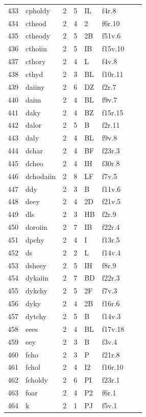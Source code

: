\documentclass[11pt,a4paper]{article}
\begin{document}
\begin{landscape}
\begin{longtable}{@{}r>{\ttfamily}lrrl>{\ttfamily}l>{\raggedright\arraybackslash}p{80mm}>{\raggedright\arraybackslash}p{36mm}@{}}
433 & cpholdy & 2 & 5 & IL & f4r.8 &  & \\
434 & ctheod & 2 & 4 & 2 & f6r.10 &  & \\
435 & ctheody & 2 & 5 & 2B & f51v.6 &  & \\
436 & cthoiin & 2 & 5 & IB & f15v.10 &  & \\
437 & cthory & 2 & 4 & L & f4v.8 &  & \\
438 & cthyd & 2 & 3 & BL & f10r.11 &  & \\
439 & daiiny & 2 & 6 & DZ & f2r.7 &  & \\
440 & daim & 2 & 4 & BL & f9v.7 &  & \\
441 & daky & 2 & 4 & BZ & f15r.15 &  & \\
442 & dalor & 2 & 5 & B & f2r.11 &  & \\
443 & daly & 2 & 4 & BL & f9v.8 &  & \\
444 & dchar & 2 & 4 & BF & f23r.3 &  & \\
445 & dcheo & 2 & 4 & IH & f30r.8 &  & \\
446 & dchodaiin & 2 & 8 & LF & f7v.5 &  & \\
447 & ddy & 2 & 3 & B & f11v.6 &  & \\
448 & deey & 2 & 4 & 2D & f21v.5 &  & \\
449 & dls & 2 & 3 & HB & f2r.9 &  & \\
450 & doroiin & 2 & 7 & IB & f22r.4 &  & \\
451 & dpchy & 2 & 4 & I & f13r.5 &  & \\
452 & ds & 2 & 2 & L & f14v.4 &  & \\
453 & dsheey & 2 & 5 & IH & f8r.9 &  & \\
454 & dykaiin & 2 & 7 & BD & f22r.3 &  & \\
455 & dykchy & 2 & 5 & 2F & f7v.3 &  & \\
456 & dyky & 2 & 4 & 2B & f16r.6 &  & \\
457 & dytchy & 2 & 5 & B & f14v.3 &  & \\
458 & eees & 2 & 4 & BL & f17v.18 &  & \\
459 & eey & 2 & 3 & B & f3v.4 &  & \\
460 & fcho & 2 & 3 & P & f21r.8 &  & \\
461 & fchol & 2 & 4 & I2 & f16r.10 &  & \\
462 & fcholdy & 2 & 6 & PI & f23r.1 &  & \\
463 & foar & 2 & 4 & P2 & f6r.1 &  & \\
464 & k & 2 & 1 & PJ & f5v.1 &  & \\

\end{longtable}
\end{landscape}
\end{document}
